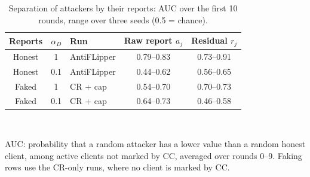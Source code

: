 \begin{table}[t]
\centering
\caption{Separation of attackers by their reports: AUC over the first 10 rounds, range over three seeds (0.5 = chance).}
\label{tab:auc}
\footnotesize
\setlength{\tabcolsep}{4pt}
\begin{tabular}{@{}cc l cc@{}}
\toprule
\textbf{Reports} & $\alpha_D$ & \textbf{Run} & Raw report $a_j$ & Residual $r_j$ \\
\midrule
Honest & 1 & AntiFLipper & 0.79--0.83 & 0.73--0.91 \\
Honest & 0.1 & AntiFLipper & 0.44--0.62 & 0.56--0.65 \\
\midrule
Faked & 1 & CR + cap & 0.54--0.70 & 0.70--0.73 \\
Faked & 0.1 & CR + cap & 0.64--0.73 & 0.46--0.58 \\
\bottomrule
\end{tabular}
\\[2pt]\parbox{\linewidth}{\scriptsize AUC: probability that a random attacker has a lower value than a random honest client, among active clients not marked by CC, averaged over rounds 0--9. Faking rows use the CR-only runs, where no client is marked by CC.}
\end{table}
